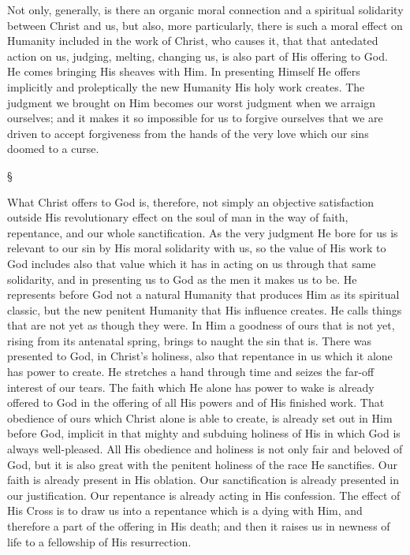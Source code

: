\documentclass[12pt,letterpaper,oneside]{book}
\begin{document}
Not only, generally, is there an organic moral 
connection and a spiritual solidarity between 
Christ and us, but also, more particularly, there 
is such a moral effect on Humanity included in 
the work of Christ, who causes it, that that antedated 
action on us, judging, melting, changing 
us, is also part of His offering to God. He comes 
bringing His sheaves with Him. In presenting 
Himself He offers implicitly and proleptically 
the new Humanity His holy work creates. The 
judgment we brought on Him becomes our 
worst judgment when we arraign ourselves; 
and it makes it so impossible for us to forgive 
ourselves that we are driven to accept forgiveness 
from the hands of the very love which 
our sins doomed to a curse. 

\begin{center}
\S
\end{center}

What Christ offers to God is, therefore, not 
simply an objective satisfaction outside His 
revolutionary effect on the soul of man in the 
way of faith, repentance, and our whole sanctification. 
As the very judgment He bore for 
us is relevant to our sin by His moral solidarity 
with us, so the value of His work to God includes 
also that value which it has in acting 
on us through that same solidarity, and in presenting 
us to God as the men it makes us to be. 
He represents before God not a natural Humanity 
that produces Him as its spiritual classic, but 
the new penitent Humanity that His influence 
creates. He calls things that are not yet as 
though they were. In Him a goodness of ours 
that is not yet, rising from its antenatal spring, 
brings to naught the sin that is. There was 
presented to God, in Christ's holiness, also that 
repentance in us which it alone has power to 
create. He stretches a hand through time and 
seizes the far-off interest of our tears. The 
faith which He alone has power to wake is 
already offered to God in the offering of 
all His powers and of His finished work. 
That obedience of ours which Christ alone 
is able to create, is already set out in Him 
before God, implicit in that mighty and subduing 
holiness of His in which God is always 
well-pleased. All His obedience and holiness 
is not only fair and beloved of God, but it is 
also great with the penitent holiness of the race 
He sanctifies. Our faith is already present in His 
oblation. Our sanctification is already presented 
in our justification. Our repentance is already 
acting in His confession. The effect of His 
Cross is to draw us into a repentance which 
is a dying with Him, and therefore a part of 
the offering in His death; and then it raises 
us in newness of life to a fellowship of His 
resurrection. 
\end{document}
